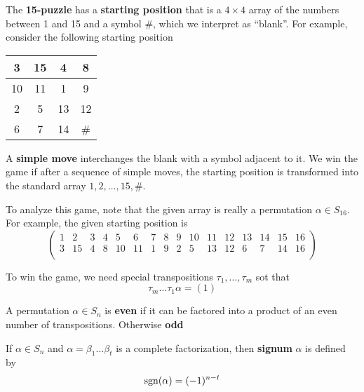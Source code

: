 \documentclass[11pt]{article}
\begin{document}
\begin{examplle}[]
The \textbf{15-puzzle} has a \textbf{starting position} that is a \(4\times 4\) array of the
numbers between 1 and 15 and a symbol \#, which we interpret as ``blank''. For
example, consider the following starting position

\begin{center}
\begin{tabular}{|c|c|c|c|}
\hline
3 & 15 & 4 & 8\\
\hline
10 & 11 & 1 & 9\\
\hline
2 & 5 & 13 & 12\\
\hline
6 & 7 & 14 & \#\\
\hline
\end{tabular}
\end{center}

A \textbf{simple move} interchanges the blank with a symbol adjacent to it. We win the
game if after a sequence of simple moves, the starting position is
transformed into the standard array \(1,2,\dots,15,\#\). 

To analyze this game, note that the given array is really a permutation
\(\alpha\in S_{16}\). For example, the given starting position is
\[
\begin{pmatrix}
 1 & 2 & 3 & 4 & 5 & 6 & 7 & 8 & 9 & 10 & 11 & 12 & 13 & 14 & 15 & 16 \\
 3 & 15 & 4 & 8 & 10 & 11 & 1 & 9 & 2 & 5 & 13 & 12 & 6 & 7 & 14 & 16 \\
\end{pmatrix}
\]

To win the game, we need special transpositions \(\tau_1,\dots,\tau_m\) sot
that
\begin{equation*}
\tau_m\dots\tau_1\alpha=(1)
\end{equation*}
\end{examplle}

\begin{definition}[]
A permutation \(\alpha\in S_n\) is \textbf{even} if it can be factored into a
product of an even number of transpositions. Otherwise \textbf{odd}
\end{definition}

\begin{definition}[]
If \(\alpha\in S_n\) and \(\alpha=\beta_1\dots\beta_t\) is a complete
factorization, then \textbf{signum} \(\alpha\) is defined by
\begin{equation*}
\operatorname{sgn}(\alpha)=(-1)^{n-t}
\end{equation*}
\end{definition}
\end{document}
